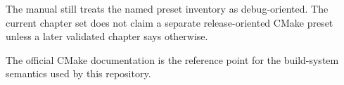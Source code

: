 The manual still treats the named preset inventory as debug-oriented. The
current chapter set does not claim a separate release-oriented CMake preset
unless a later validated chapter says otherwise.

The official CMake documentation is the reference point for the build-system
semantics used by this repository. \cite{cmake-docs}
